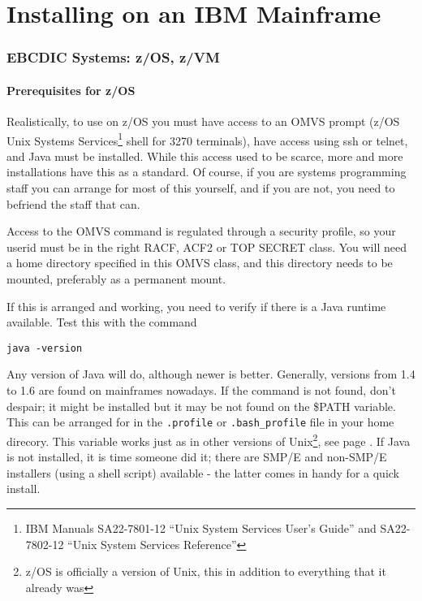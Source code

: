 \chapter{Installing on an IBM Mainframe}
\subsection{EBCDIC Systems: z/OS, z/VM}

\subsubsection{Prerequisites for z/OS}
Realistically, to use \nr{} on z/OS you must have access to an OMVS
prompt (z/OS Unix Systems Services\footnote{IBM Manuals SA22-7801-12 ``Unix System
  Services User's Guide''
  and  SA22-7802-12 ``Unix System Services Reference''}  shell for 3270 terminals), have
access using ssh or telnet, and Java must be installed. While this
access used to be scarce, more and more installations have this as a
standard. Of course, if you are systems programming staff you can
arrange for most of this yourself, and if you are not, you need to
befriend the staff that can.

Access to the OMVS command is regulated through a security profile, so your userid
must be in the right RACF, ACF2 or TOP SECRET class. You will need a home
directory specified in this OMVS class, and this directory needs to be
mounted, preferably as a permanent mount.

If this is arranged and working, you need to verify if there is a Java
runtime available. Test this with the command 
\begin{verbatim}
java -version
\end{verbatim}
Any version of Java will do, although newer is better. Generally,
versions from 1.4 to 1.6 are found on mainframes nowadays. If the
command is not found, don't despair; it might be installed but it may
be not found on the \$PATH variable. This can be arranged for in the
\texttt{.profile} or \texttt{.bash\_profile} file in your home direcory. This variable works
just as in other versions of Unix\footnote{z/OS is officially a
  version of Unix, this in addition to everything that it already was}, see
page \pageref{install_classpath}. If Java is not installed, it is time
someone did it; there are SMP/E and non-SMP/E installers (using a
shell script) available -
the latter comes in handy for a quick install.

